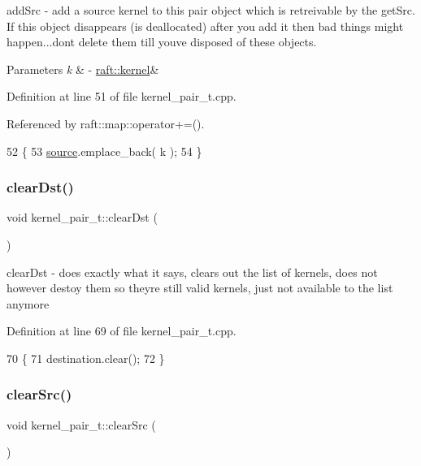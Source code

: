 add\+Src -\/ add a source kernel to this pair object which is retreivable by the get\+Src. If this object disappears (is deallocated) after you add it then bad things might happen...don\textquotesingle{}t delete them till you\textquotesingle{}ve disposed of these objects. 
\begin{DoxyParams}{Parameters}
{\em k} & -\/ \hyperlink{classraft_1_1kernel}{raft\+::kernel}\& \\
\hline
\end{DoxyParams}


Definition at line 51 of file kernel\+\_\+pair\+\_\+t.\+cpp.



Referenced by raft\+::map\+::operator+=().


\begin{DoxyCode}
52 \{
53     \hyperlink{classsource}{source}.emplace\_back( k );
54 \}
\end{DoxyCode}
\hypertarget{classkernel__pair__t_a0b402c8a6d486e713ea98b9dfaf1239a}{}\label{classkernel__pair__t_a0b402c8a6d486e713ea98b9dfaf1239a} 
\subsubsection{\texorpdfstring{clear\+Dst()}{clearDst()}}
{\footnotesize\ttfamily void kernel\+\_\+pair\+\_\+t\+::clear\+Dst (\begin{DoxyParamCaption}{ }\end{DoxyParamCaption})\hspace{0.3cm}{\ttfamily [noexcept]}}

clear\+Dst -\/ does exactly what it says, clears out the list of kernels, does not however destoy them so they\textquotesingle{}re still valid kernels, just not available to the list anymore 

Definition at line 69 of file kernel\+\_\+pair\+\_\+t.\+cpp.


\begin{DoxyCode}
70 \{
71     destination.clear();
72 \}
\end{DoxyCode}
\hypertarget{classkernel__pair__t_a853076440144fbb3c5a3524536a46336}{}\label{classkernel__pair__t_a853076440144fbb3c5a3524536a46336} 
\subsubsection{\texorpdfstring{clear\+Src()}{clearSrc()}}
{\footnotesize\ttfamily void kernel\+\_\+pair\+\_\+t\+::clear\+Src (\begin{DoxyParamCaption}{ }\end{DoxyParamCaption})\hspace{0.3cm}{\ttfamily [noexcept]}}


